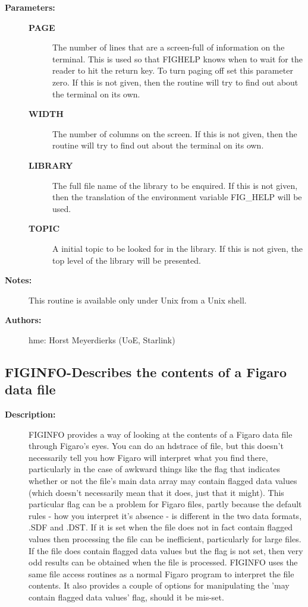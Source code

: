 \begin{description}
\begin{description}
\item [\textbf{Parameters:}]
\begin{description}
\item [\textbf{PAGE}]
 The number of lines that are a screen-full of information on
 the terminal. This is used so that FIGHELP knows when to wait
 for the reader to hit the return key. To turn paging off set
 this parameter zero. If this is not given, then the routine will
 try to find out about the terminal on its own.
\item [\textbf{WIDTH}]
 The number of columns on the screen. If this is not given, then
 the routine will try to find out about the terminal on its own.
\item [\textbf{LIBRARY}]
 The full file name of the library to be enquired. If this is
 not given, then the translation of the environment variable
 FIG\_HELP will be used.
\item [\textbf{TOPIC}]
 A initial topic to be looked for in the library. If this is not
 given, the top level of the library will be presented.
\end{description}

\item [\textbf{Notes:}]
 This routine is available only under Unix from a Unix shell.

\item [\textbf{Authors:}]
 hme: Horst Meyerdierks (UoE, Starlink)
\end{description}
\subsection{FIGINFO-\label{FIGINFO}Describes the contents of a Figaro data file}
\begin{description}

\item [\textbf{Description:}]
 FIGINFO provides a way of looking at the contents of a Figaro data
 file through Figaro's eyes. You can do an hdstrace of file, but this
 doesn't necessarily tell you how Figaro will interpret what you
 find there, particularly in the case of awkward things like the
 flag that indicates whether or not the file's main data array may
 contain flagged data values (which doesn't necessarily mean that it
 does, just that it might). This particular flag can be a problem for
 Figaro files, partly because the default rules - how you interpret
 it's absence - is different in the two data formats, .SDF and .DST.
 If it is set when the file does not in fact contain flagged values then
 processing the file can be inefficient, particularly for large files. If
 the file does contain flagged data values but the flag is not set, then
 very odd results can be obtained when the file is processed. FIGINFO
 uses the same file access routines as a normal Figaro program to
 interpret the file contents. It also provides a couple of options for
 manipulating the 'may contain flagged data values' flag, should it
 be mis-set.


\end{description}
\end{description}
